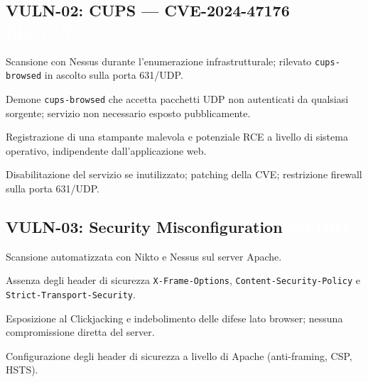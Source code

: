 \documentclass[11pt]{article}
\newcommand{\sev}[2]{%
  \setlength{\fboxsep}{3pt}%
  \colorbox{#1}{\textcolor{white}{\small\textbf{#2}}}%
}
\newcommand{\sevHIGH}{\sev{sevElevato}{ELEVATO}}
\newcommand{\sevMED}{\sev{sevMedio}{MEDIO}}
\begin{document}
\subsection{VULN-02: CUPS — CVE-2024-47176 \hfill \sevHIGH}
\begin{description}[leftmargin=2.4cm, style=nextline]
    \item[Scoperta] Scansione con Nessus durante l'enumerazione infrastrutturale; rilevato \texttt{cups-browsed} in ascolto sulla porta 631/UDP.
    \item[Cause] Demone \texttt{cups-browsed} che accetta pacchetti UDP non autenticati da qualsiasi sorgente; servizio non necessario esposto pubblicamente.
    \item[Rischi e impatti] Registrazione di una stampante malevola e potenziale RCE a livello di sistema operativo, indipendente dall'applicazione web.
    \item[Contromisure] Disabilitazione del servizio se inutilizzato; patching della CVE; restrizione firewall sulla porta 631/UDP.
\end{description}

\subsection{VULN-03: Security Misconfiguration \hfill \sevMED}
\begin{description}[leftmargin=2.4cm, style=nextline]
    \item[Scoperta] Scansione automatizzata con Nikto e Nessus sul server Apache.
    \item[Cause] Assenza degli header di sicurezza \texttt{X-Frame-Options}, \texttt{Content-Security-Policy} e \texttt{Strict-Transport-Security}.
    \item[Rischi e impatti] Esposizione al Clickjacking e indebolimento delle difese lato browser; nessuna compromissione diretta del server.
    \item[Contromisure] Configurazione degli header di sicurezza a livello di Apache (anti-framing, CSP, HSTS).
\end{description}


\end{document}
